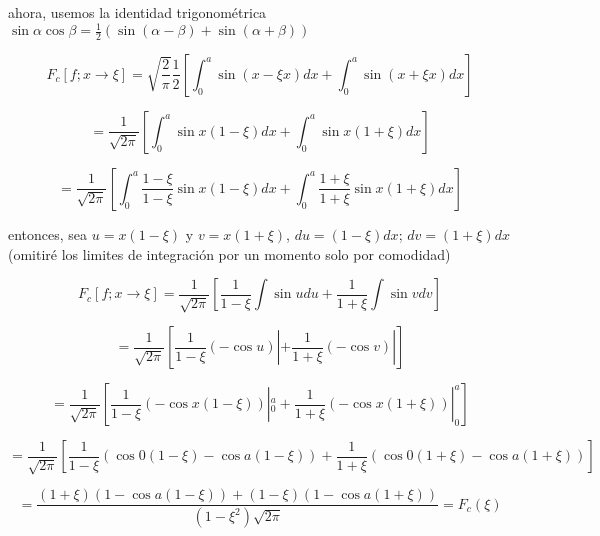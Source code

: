 \documentclass[12pt,a4paper]{article}
\begin{document}
\begin{enumerate}
    ahora, usemos la identidad trigonométrica $\sin{\alpha}\cos{\beta}= \frac{1}{2}(\sin{(\alpha-\beta)}+\sin{(\alpha+\beta)})$
    
    \begin{equation*}
        F_c[f;x \rightarrow \xi] = \sqrt{\frac{2}{\pi}}\frac{1}{2}\left[\int_{0}^{a} \sin{(x-\xi x)}dx+\int_{0}^{a}\sin{(x+\xi x)}dx\right]
    \end{equation*}
    
    \begin{equation*}
        = \frac{1}{\sqrt{2\pi}}\left[\int_{0}^{a} \sin{x(1-\xi)}dx+\int_{0}^{a}\sin{x(1+\xi)}dx\right]
    \end{equation*}
    
    \begin{equation*}
        = \frac{1}{\sqrt{2\pi}}\left[\int_{0}^{a}\frac{1-\xi}{1- \xi} \sin{x(1-\xi)}dx+\int_{0}^{a}\frac{1+ \xi}{1+ \xi}\sin{x(1+\xi)}dx\right]
    \end{equation*}
    
    entonces, sea $u=x(1-\xi)$ y $v=x(1+\xi)$, $du=(1-\xi)dx$; $dv=(1+\xi)dx$(omitiré los limites de integración por un momento solo por comodidad)
    
    \begin{equation*}
        F_c[f;x \rightarrow \xi] = \frac{1}{\sqrt{2\pi}}\left[ \frac{1}{1- \xi}\int \sin{u}du+\frac{1}{1+ \xi}\int\sin{v}dv\right]
    \end{equation*}
    
    \begin{equation*}
        = \frac{1}{\sqrt{2\pi}}\left[ \frac{1}{1- \xi}(-\cos{u})|+\frac{1}{1+ \xi}(-\cos{v})|\right]
    \end{equation*}
    
    \begin{equation*}
        = \frac{1}{\sqrt{2\pi}}\left[ \frac{1}{1- \xi}(-\cos{x(1-\xi)})|_{0}^{a}+\frac{1}{1+ \xi}(-\cos{x(1+\xi)})|_{0}^{a}\right]
    \end{equation*}
    
    \begin{equation*}
        = \frac{1}{\sqrt{2\pi}}\left[ \frac{1}{1- \xi}(\cos{0(1-\xi)}-\cos{a(1-\xi)})+\frac{1}{1+\xi}(\cos{0(1+\xi)}-\cos{a(1+\xi)})\right]
    \end{equation*}
    
    \begin{equation*}
        = \frac{(1+\xi)(1-\cos{a(1-\xi)})+(1-\xi)(1-\cos{a(1+\xi)})}{(1-\xi^2)\sqrt{2\pi}} = F_c (\xi)
    \end{equation*}
    

\end{enumerate}
\end{document}
